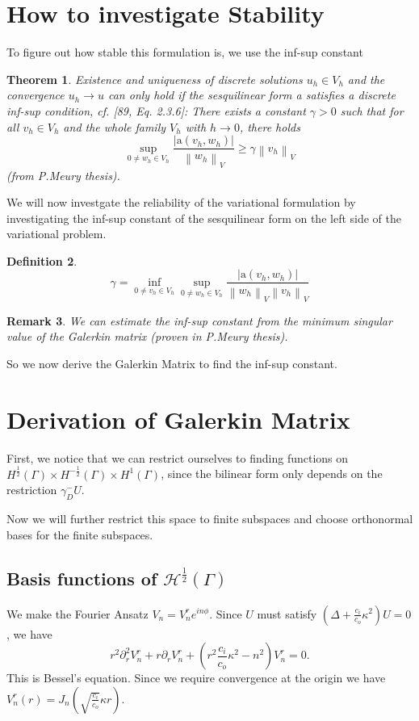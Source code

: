 \documentclass[10pt,journal,compsoc, onecolumn]{IEEEtran}
\newtheorem{theorem}{Theorem}[section]
\newtheorem{definition}[theorem]{Definition}
\newtheorem{remark}[theorem]{Remark}
\begin{document}
\section{How to investigate Stability}
To figure out how stable this formulation is, we use the inf-sup constant
\begin{theorem}
    Existence and uniqueness of discrete solutions \(u_{h} \in V_{h}\) and the convergence \(u_{h} \rightarrow u\) can only
hold if the sesquilinear form a satisfies a discrete inf-sup condition, cf. [89, Eq. 2.3.6]: There
exists a constant \(\gamma>0\) such that for all \(v_{h} \in V_{h}\) and the whole family \(V_{h}\) with \(h \rightarrow 0\), there
holds
$$
\sup _{0 \neq w_{h} \in V_{h}} \frac{\left|\mathrm{a}\left(v_{h}, w_{h}\right)\right|}{\left\|w_{h}\right\|_{V}} \geq \gamma\left\|v_{h}\right\|_{V}
$$ (from P.Meury thesis).
\end{theorem}
We will now investgate the reliability of the variational formulation by investigating the inf-sup constant of the sesquilinear form on the left side of the variational problem. 
\begin{definition}
$$
\gamma = \inf_{0 \neq v_h \in V_h}\sup _{0 \neq w_{h} \in V_{h}} \frac{\left|\mathrm{a}\left(v_{h}, w_{h}\right)\right|}{\left\|w_{h}\right\|_{V}\left\|v_{h}\right\|_{V}} 
$$ 
\end{definition}
\begin{remark}
    We can estimate the inf-sup constant from the minimum singular value of the Galerkin matrix (proven in P.Meury thesis).
\end{remark}

So we now derive the Galerkin Matrix to find the inf-sup constant. 


\section{Derivation of Galerkin Matrix}
First, we notice that we can restrict ourselves to finding functions on $H^{\frac{1}{2}}(\Gamma)\times H^{-\frac{1}{2}}(\Gamma) \times H^1(\Gamma)$, since the bilinear form only depends on the restriction $\gamma_D^-U$. 

Now we will further restrict this space to finite subspaces and choose orthonormal bases for the finite subspaces. 
\subsection{Basis functions of $\mathcal{H}^{\frac{1}{2}}(\Gamma)$}
We make the Fourier Ansatz $V_n = V^r_n e^{i n \phi}$. 
Since $U$ must satisfy  $(\Delta + \frac{c_i}{c_o}\kappa^2) U = 0$, we have 
$$
r^2 \partial_r^2V_n^r + r \partial_r V_n^r + (r^2  \frac{c_i}{c_o}\kappa^2 - n^2)V^r_n = 0.
$$
This is Bessel's equation. Since we require convergence at the origin we have $V^r_n(r) = J_n(\sqrt{ \frac{c_i}{c_o}}\kappa r)$.
\end{document}
